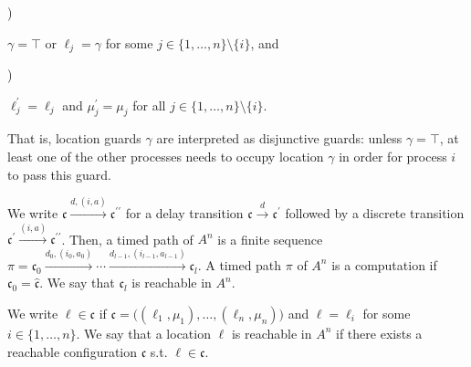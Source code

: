  
 
\par{}) 
 
$\gamma=\top$ or $\mathrm{\ell}_{j}=\gamma$ for some $j\in\{1,\dots,n\}\setminus\{i\}$, and\par
 
 
 
\par{}) 
 
$\mathrm{\ell}_{j}^{\prime}=\mathrm{\ell}_{j}$ and $\mu_{j}^{\prime}=\mu_{j}$ for all $j\in\{1,\dots,n\}\setminus\{i\}$.\par
 
 
  
   
 
 
That is, location guards $\gamma$ are interpreted as disjunctive guards: unless $\gamma=\top$, at least one of the other processes needs to occupy location $\gamma$ in order for process $i$ to pass this guard.\par
 
 
 
We write ${\mathfrak{c}}\xrightarrow{d,(i,a)}{\mathfrak{c}^{\prime\prime}}$ for a delay transition ${\mathfrak{c}}\xrightarrow{d}{\mathfrak{c}^{\prime}}$ followed by a discrete transition ${\mathfrak{c}^{\prime}}\xrightarrow{(i,a)}{\mathfrak{c}^{\prime\prime}}$. Then, a timed path of ${{A}}^{n}$ is a finite sequence $\pi=\mathfrak{c}_{0}\xrightarrow{d_{0},(i_{0},a_{0})}\cdots\xrightarrow{d_{l-1},(i_{l-1},a_{l-1})}\mathfrak{c}_{l}$. A timed path $\pi$ of ${{A}}^{n}$ is a computation if $\mathfrak{c}_{0}=\hat{\mathfrak{c}}$. We say that $\mathfrak{c}_{l}$ is reachable in ${{A}}^{n}$.\par
 
 
 
We write $\mathrm{\ell}\in\mathfrak{c}$ if $\mathfrak{c}=\big((\mathrm{\ell}_{1},\mu_{1}),\ldots,(\mathrm{\ell}_{n},\mu_{n})\big)$ and $\mathrm{\ell}=\mathrm{\ell}_{i}$ for some $i\in\{1,\dots,n\}$. We say that a location $\mathrm{\ell}$ is reachable in ${{A}}^{n}$ if there exists a reachable configuration $\mathfrak{c}$ s.t. $\mathrm{\ell}\in\mathfrak{c}$.\par
 

